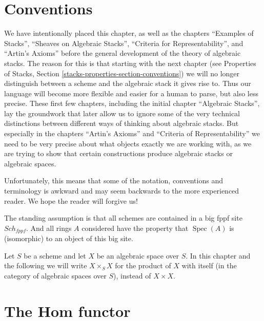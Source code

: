 \documentclass{stacks-project}
\theoremstyle{plain}
\theoremstyle{definition}
\theoremstyle{remark}
\numberwithin{equation}{subsection}
\def\Spec{\mathop{\mathrm{Spec}}}
\def\Sch{\mathit{Sch}}
\begin{document}
\section{Conventions}
\label{section-conventions}

\noindent
We have intentionally placed this chapter, as well as the chapters
``Examples of Stacks'', ``Sheaves on Algebraic Stacks'',
``Criteria for Representability'', and ``Artin's Axioms'' before the
general development of the theory of algebraic stacks. The reason
for this is that starting with the next chapter (see
Properties of Stacks, Section \ref{stacks-properties-section-conventions})
we will no longer distinguish between a scheme and the algebraic stack
it gives rise to. Thus our language will become more flexible and
easier for a human to parse, but also less precise. These first few
chapters, including the initial chapter ``Algebraic Stacks'', lay the
groundwork that later allow us to ignore some of the very technical
distinctions between different ways of thinking about algebraic stacks.
But especially in the chapters ``Artin's Axioms'' and
``Criteria of Representability'' we need
to be very precise about what objects exactly we are working with, as
we are trying to show that certain constructions produce algebraic stacks or
algebraic spaces.

\medskip\noindent
Unfortunately, this means that some of the notation, conventions and
terminology is awkward and may seem backwards to the more experienced
reader. We hope the reader will forgive us!

\medskip\noindent
The standing assumption is that all schemes are contained in
a big fppf site $\Sch_{fppf}$. And all rings $A$ considered
have the property that $\Spec(A)$ is (isomorphic) to an
object of this big site.

\medskip\noindent
Let $S$ be a scheme and let $X$ be an algebraic space over $S$.
In this chapter and the following we will write $X \times_S X$
for the product of $X$ with itself (in the category of algebraic
spaces over $S$), instead of $X \times X$.















\section{The Hom functor}
\label{section-hom}
\end{document}
